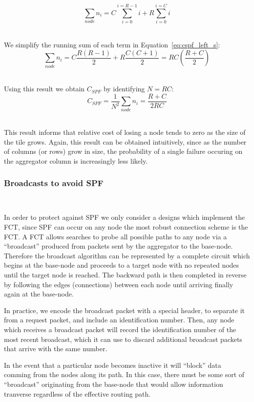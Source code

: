 \begin{equation}
  \sum_{node}n_{i} = C\sum_{i=0}^{i=R-1}i + R\sum_{i=0}^{i=C}i
\end{equation}~\label{eq:cspf_left_s}

We simplify the running sum of each term in Equation~\ref{eq:cspf_left_s}:
\begin{equation}
  \sum_{node}n_{i} = C\frac{R(R-1)}{2} + R\frac{C(C+1)}{2} = RC(\frac{R+C}{2})
\end{equation}~\label{eq:cspf_left_e}

Using this result we obtain $C_{SPF}$ by identifying $N = RC$:
\begin{equation}
  C_{SPF} = \frac{1}{N^{2}}\sum_{node}n_{i} = \boxed{\frac{R+C}{2RC}}
\end{equation}~\label{eq:cspf_left_fin}

This result informs that relative cost of losing a node tends to zero as the size of the tile grows.
Again, this result can be obtained intuitively, since as the number of columns (or rows) grow in size, the probability of a single failure occuring on the aggregator column is increasingly less likely.


\subsubsection{Broadcasts to avoid SPF}~\label{sec:broadcast}

In order to protect against SPF we only consider a designs which implement the FCT, since SPF can occur on any node the most robust connection scheme is the FCT.
A FCT allows searches to probe all possible paths to any node via a ``broadcast'' produced from packets sent by the aggregator to the base-node.
Therefore the broadcast algorithm can be represented by a complete circuit which begins at the base-node and proceeds to a target node with no repeated nodes until the target node is reached.
The backward path is then completed in reverse by following the edges (connections) between each node until arriving finally again at the base-node.

In practice, we encode the broadcast packet with a special header, to separate it from a request packet, and include an identification number.
Then, any node which receives a broadcast packet will record the identification number of the most recent broadcast, which it can use to discard additional broadcast packets that arrive with the same number.

In the event that a particular node becomes inactive it will ``block'' data comming from the nodes along its path.
In this case, there must be some sort of ``broadcast'' originating from the base-node that would allow information tranverse regardless of the effective routing path.


